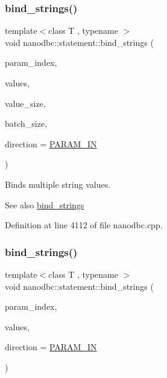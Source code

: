 \subsubsection{\texorpdfstring{bind\_strings()}{bind\_strings()}\hspace{0.1cm}{\footnotesize\ttfamily [1/9]}}
{\footnotesize\ttfamily template$<$class T , typename $>$ \\
void nanodbc\+::statement\+::bind\+\_\+strings (\begin{DoxyParamCaption}\item[{short}]{param\+\_\+index,  }\item[{T const $\ast$}]{values,  }\item[{std\+::size\+\_\+t}]{value\+\_\+size,  }\item[{std\+::size\+\_\+t}]{batch\+\_\+size,  }\item[{\mbox{\hyperlink{classnanodbc_1_1statement_a523142f53cbbee8d68a074da993e7fa6}{param\+\_\+direction}}}]{direction = {\ttfamily \mbox{\hyperlink{classnanodbc_1_1statement_a523142f53cbbee8d68a074da993e7fa6ae33f42ce0677d00c291ff4d8e39f99de}{P\+A\+R\+A\+M\+\_\+\+IN}}} }\end{DoxyParamCaption})}



Binds multiple string values. 

\begin{DoxySeeAlso}{See also}
\mbox{\hyperlink{group__bind__strings_ga8914c229f28ee7b02cf1b85684741326}{bind\+\_\+strings}} 
\end{DoxySeeAlso}


Definition at line 4112 of file nanodbc.\+cpp.

\mbox{\label{group__bind__strings_gaecd4578e6c204ffb15203e743a4ffdba}} 
\subsubsection{\texorpdfstring{bind\_strings()}{bind\_strings()}\hspace{0.1cm}{\footnotesize\ttfamily [2/9]}}
{\footnotesize\ttfamily template$<$class T , typename $>$ \\
void nanodbc\+::statement\+::bind\+\_\+strings (\begin{DoxyParamCaption}\item[{short}]{param\+\_\+index,  }\item[{std\+::vector$<$ T $>$ const \&}]{values,  }\item[{\mbox{\hyperlink{classnanodbc_1_1statement_a523142f53cbbee8d68a074da993e7fa6}{param\+\_\+direction}}}]{direction = {\ttfamily \mbox{\hyperlink{classnanodbc_1_1statement_a523142f53cbbee8d68a074da993e7fa6ae33f42ce0677d00c291ff4d8e39f99de}{P\+A\+R\+A\+M\+\_\+\+IN}}} }\end{DoxyParamCaption})}



